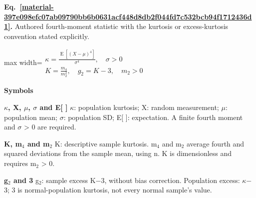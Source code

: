 \documentclass[11pt,a4paper]{article}
\begin{document}
\par\medskip
\begin{samepage}
\label{material-397e098efc07ab09790bb6b0631acf448d8db2f044fd7c532bcb94f1712436d1}
\noindent\textbf{Eq.~\ref*{material-397e098efc07ab09790bb6b0631acf448d8db2f044fd7c532bcb94f1712436d1}.} Authored fourth-moment statistic with the kurtosis or excess-kurtosis convention stated explicitly.\par\nopagebreak
\begin{center}\begin{adjustbox}{max width=\linewidth}$\displaystyle \begin{gathered}\kappa=\frac{\operatorname{E}[(X-\mu)^4]}{\sigma^4},\quad\sigma>0\\K=\frac{m_4}{m_2^2},\quad g_2=K-3,\quad m_2>0\end{gathered}$\end{adjustbox}\end{center}

\par\noindent\textbf{Symbols}

\par\noindent\textbf{\ensuremath{\kappa}, X, \ensuremath{\mu}, \ensuremath{\sigma} and E[ ]} \ensuremath{\kappa}: population kurtosis; X: random measurement; \ensuremath{\mu}: population mean; \ensuremath{\sigma}: population SD; E[ ]: expectation. A finite fourth moment and \ensuremath{\sigma} > 0 are required.

\par\noindent\textbf{K, m\ensuremath{{}_4} and m\ensuremath{{}_2}} K: descriptive sample kurtosis. m\ensuremath{{}_4} and m\ensuremath{{}_2} average fourth and squared deviations from the sample mean, using n. K is dimensionless and requires m\ensuremath{{}_2} > 0.

\par\noindent\textbf{g\ensuremath{{}_2} and 3} g\ensuremath{{}_2}: sample excess K\ensuremath{-}3, without bias correction. Population excess: \ensuremath{\kappa}\ensuremath{-}3; 3 is normal-population kurtosis, not every normal sample's value.

\end{samepage}
\medskip
\end{document}
